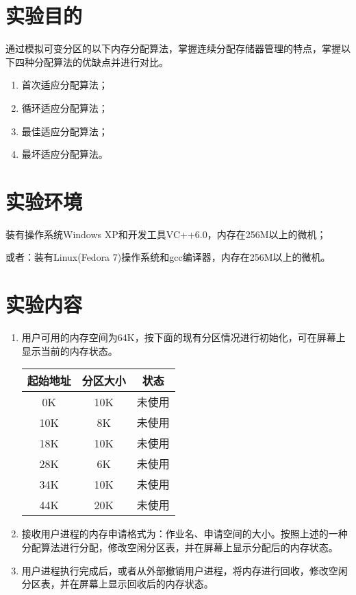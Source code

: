 \documentclass[c5size,a4paper,nofonts]{ctexart}
\begin{document}

\setcounter{part}{3}


\iffalse
\section{实验目的}
通过模拟可变分区的以下内存分配算法，掌握连续分配存储器管理的特点，掌握以下四种分配算法的优缺点并进行对比。
\begin{enumerate}
\item 首次适应分配算法；
\item 循环适应分配算法；
\item 最佳适应分配算法；
\item 最坏适应分配算法。
\end{enumerate}

\section{实验环境}
装有操作系统Windows XP和开发工具VC++6.0，内存在256M以上的微机；

或者：装有Linux(Fedora 7)操作系统和gcc编译器，内存在256M以上的微机。

\section{实验内容}
\begin{enumerate}[label={(\arabic*)}]
\item 用户可用的内存空间为64K，按下面的现有分区情况进行初始化，可在屏幕上显示当前的内存状态。
\UndefineShortVerb{\|}
\begin{tabular}{|c|c|c|}\hline
起始地址 & 分区大小 & 状态\\\hline
0K & 10K & 未使用\\\hline
10K & 8K & 未使用\\\hline
18K & 10K & 未使用\\\hline
28K & 6K & 未使用\\\hline
34K & 10K & 未使用\\\hline
44K & 20K & 未使用\\\hline
\end{tabular}
\DefineShortVerb{\|}
\item 接收用户进程的内存申请格式为：作业名、申请空间的大小。按照上述的一种分配算法进行分配，修改空闲分区表，并在屏幕上显示分配后的内存状态。
\item 用户进程执行完成后，或者从外部撤销用户进程，将内存进行回收，修改空闲分区表，并在屏幕上显示回收后的内存状态。
\end{enumerate}
\end{document}
